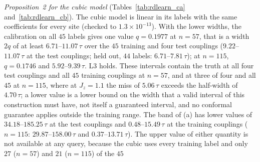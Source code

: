 \documentclass[aps,prx,onecolumn,10pt,nofootinbib,longbibliography,floatfix]{revtex4-2}
\theoremstyle{remark}
\newcommand{\Jz}{J_z}
\begin{document}
\emph{Proposition~2 for the cubic model} (Tables~\ref{tab:rdlearn_ca} and~\ref{tab:rdlearn_cb}). The cubic model %
is linear in its labels with the same coefficients for every site (checked to $1.3\times10^{-13}$). With the lower %
widths, the calibration on all $45$ labels gives one value $q=0.1977$ at $n=57$, that is a width $2q$ of at least %
$6.71$--$11.07\,\tau$ over the $45$ training and four test couplings ($9.22$--$11.07\,\tau$ at the test couplings; %
held out, $44$ labels: $6.71$--$7.81\,\tau$); at $n=115$, $q=0.1746$ and $5.92$--$9.39\,\tau$. L3 holds. These %
intervals contain the truth at all four test couplings and all $45$ training couplings at $n=57$, and at three of %
four and all $45$ at $n=115$, where at $\Jz=1.1$ the miss of $5.06\,\tau$ exceeds the half-width of $4.70\,\tau$; %
a lower value is a lower bound on the width that a valid interval of this construction must have, not itself a
guaranteed interval, and no conformal guarantee applies outside the training range. The band of (a) has lower
values of $34.18$--$185.25\,\tau$ at the test couplings and $0.48$--$15.49\,\tau$ at the training couplings %
($n=115$: $29.87$--$158.00\,\tau$ and $0.37$--$13.71\,\tau$). The upper value of either quantity is not available %
at any query, because the cubic uses every training label and only $27$ ($n=57$) and $21$ ($n=115$) of the $45$ %
\end{document}
